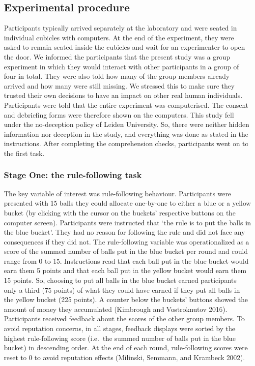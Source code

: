 \documentclass[man]{apa6}
\begin{document}
\hypertarget{experimental-procedure}{%
\subsection{Experimental procedure}\label{experimental-procedure}}

Participants typically arrived separately at the laboratory and were
seated in individual cubicles with computers. At the end of the
experiment, they were asked to remain seated inside the cubicles and
wait for an experimenter to open the door. We informed the participants
that the present study was a group experiment in which they would
interact with other participants in a group of four in total. They were
also told how many of the group members already arrived and how many
were still missing. We stressed this to make sure they trusted their own
decisions to have an impact on other real human individuals.
Participants were told that the entire experiment was computerised. The
consent and debriefing forms were therefore shown on the computers. This
study fell under the no-deception policy of Leiden University. So, there
were neither hidden information nor deception in the study, and
everything was done as stated in the instructions. After completing the
comprehension checks, participants went on to the first task.

\hypertarget{stage-one-the-rule-following-task}{%
\subsubsection{Stage One: the rule-following
task}\label{stage-one-the-rule-following-task}}

The key variable of interest was rule-following behaviour. Participants
were presented with 15 balls they could allocate one-by-one to either a
blue or a yellow bucket (by clicking with the cursor on the buckets'
respective buttons on the computer screen). Participants were instructed
that `the rule is to put the balls in the blue bucket'. They had no
reason for following the rule and did not face any consequences if they
did not. The rule-following variable was operationalized as a score of
the summed number of balls put in the blue bucket per round and could
range from 0 to 15. Instructions read that each ball put in the blue
bucket would earn them 5 points and that each ball put in the yellow
bucket would earn them 15 points. So, choosing to put all balls in the
blue bucket earned participants only a third (75 points) of what they
could have earned if they put all balls in the yellow bucket (225
points). A counter below the buckets' buttons showed the amount of money
they accumulated (Kimbrough and Vostroknutov 2016). Participants
received feedback about the scores of the other group members. To avoid
reputation concerns, in all stages, feedback displays were sorted by the
highest rule-following score (i.e.~the summed number of balls put in the
blue bucket) in descending order. At the end of each round,
rule-following scores were reset to 0 to avoid reputation effects
(Milinski, Semmann, and Krambeck 2002).
\end{document}
